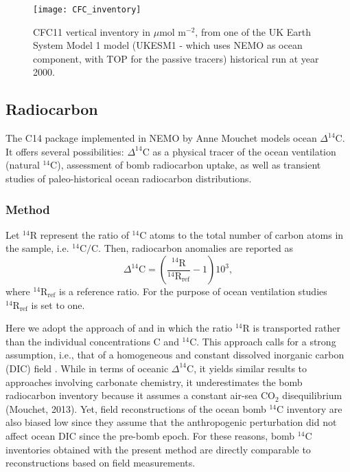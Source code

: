 \documentclass[../main/TOP_manual]{subfiles}
\newcommand{\cd}{\mathrm{CO_2}}
\newcommand{\cq}{\mathrm{^{14}C}}
\newcommand{\Dcq}{\Delta ^{14}\mathrm{C}}
\newcommand{\Rq}{\mathrm{^{14}{R}}}
\begin{document}
\begin{figure}[!h]
\centering
\texttt{[image: CFC\_inventory]}
  \caption{CFC11 vertical inventory in $\mu$mol m$^{-2}$, from one of the UK Earth System Model 1 model (UKESM1 - which uses NEMO as ocean component, with TOP for the passive tracers) historical run at year 2000.}
\label{img_cfcinv}
\end{figure}


\subsection{Radiocarbon}

%

The C14 package implemented in NEMO by Anne Mouchet models ocean $\Dcq$. It offers several possibilities: $\Dcq$ as a physical tracer of the ocean ventilation (natural $\cq$), assessment of bomb radiocarbon uptake, as well as transient studies of paleo-historical ocean radiocarbon distributions.

\subsubsection{Method}

 Let  $\Rq$ represent the ratio of $\cq$ atoms to the total number of carbon atoms in the sample, i.e. $\cq/\mathrm{C}$. Then, radiocarbon anomalies are reported as
\begin{equation}
\Dcq = \left( \frac{\Rq}{\Rq_\mathrm{ref}} - 1 \right) 10^3, \label{eq:c14dcq}
\end{equation}
where $\Rq_{\textrm{ref}}$ is a reference ratio. For the purpose of ocean ventilation studies $\Rq_{\textrm{ref}}$ is set to one.

Here we adopt the approach of \cite{fiadeiro_1982} and \cite{toggweiler_1989a,toggweiler_1989b} in which  the ratio $\Rq$ is transported rather than the individual concentrations C and $\cq$.
This approach calls for a strong assumption, i.e., that of a homogeneous and constant dissolved inorganic carbon (DIC) field \citep{toggweiler_1989a,mouchet_2013}. While in terms of
oceanic $\Dcq$, it yields similar results to approaches involving carbonate chemistry, it underestimates the bomb radiocarbon inventory because it assumes a constant air-sea $\cd$ disequilibrium (Mouchet, 2013). Yet, field reconstructions of the ocean bomb $\cq$ inventory are also biased low \citep{naegler_2009} since they assume that the anthropogenic perturbation did not affect ocean DIC since the pre-bomb epoch. For these reasons, bomb $\cq$ inventories obtained with the present method are directly comparable to reconstructions based on field measurements.
\end{document}
